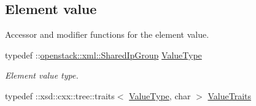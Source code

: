 \subsection*{Element value}
\label{_amgrp2ee2eae1a8c390ea033f241c027da8d6}
Accessor and modifier functions for the element value. \begin{DoxyCompactItemize}
\item 
\hypertarget{classopenstack_1_1xml_1_1SharedIpGroup___afc757e5ec502610d1c21c5407804698b}{
typedef ::\hyperlink{classopenstack_1_1xml_1_1SharedIpGroup}{openstack::xml::SharedIpGroup} \hyperlink{classopenstack_1_1xml_1_1SharedIpGroup___afc757e5ec502610d1c21c5407804698b}{ValueType}}
\label{classopenstack_1_1xml_1_1SharedIpGroup___afc757e5ec502610d1c21c5407804698b}

\begin{DoxyCompactList}\small\item\em Element value type. \item\end{DoxyCompactList}\item 
\hypertarget{classopenstack_1_1xml_1_1SharedIpGroup___acc8196e77a1d81675be293cd0f4f8042}{
typedef ::xsd::cxx::tree::traits$<$ \hyperlink{classopenstack_1_1xml_1_1SharedIpGroup}{ValueType}, char $>$ \hyperlink{classopenstack_1_1xml_1_1SharedIpGroup___acc8196e77a1d81675be293cd0f4f8042}{ValueTraits}}
\label{classopenstack_1_1xml_1_1SharedIpGroup___acc8196e77a1d81675be293cd0f4f8042}


\end{DoxyCompactItemize}
